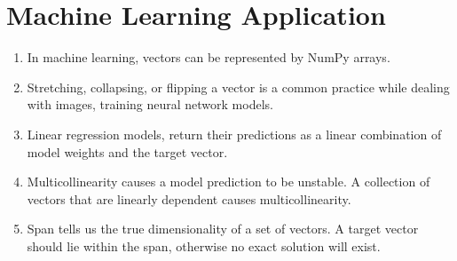 \documentclass[11pt]{article}
\begin{document}
\section{Machine Learning Application}
\begin{enumerate}
\item In machine learning, vectors can be represented by NumPy arrays.
\item Stretching, collapsing, or flipping a vector is a common practice while dealing with images, training neural network models.
\item Linear regression models, return their predictions as a linear combination of model weights and the target vector.
\item Multicollinearity causes a model prediction to be unstable. A collection of vectors that are linearly dependent causes multicollinearity.
\item Span tells us the true dimensionality of a set of vectors. A target vector should lie within the span, otherwise no exact solution will exist.
\end{enumerate}
\end{document}
